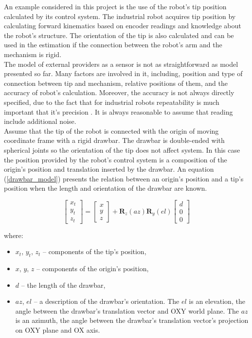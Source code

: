 An example considered in this project is the use of the robot's tip position calculated by its control system. The industrial robot acquires tip position by calculating forward kinematics based on encoder readings and knowledge about the robot's structure. The orientation of the tip is also calculated and can be used in the estimation if the connection between the robot's arm and the mechanism is rigid.\\

The model of external providers as a sensor is not as straightforward as model presented so far. Many factors are involved in it, including, position and type of connection between tip and mechanism, relative positions of them, and the accuracy of robot's calculation. Moreover, the accuracy is not always directly specified, due to the fact that for industrial robots repeatability is much important that it's precision \cite{shiakolas2002accuracy}.
It is always reasonable to assume that reading include additional noise.\\

Assume that the tip of the robot is connected with the origin of moving coordinate frame with a rigid drawbar. The drawbar is double-ended with spherical joints so the orientation of the tip does not affect system. In this case the position provided by the robot's control system is a composition of the origin's position and translation inserted by the drawbar. An equation (\ref{drawbar_model}) presents the relation between an origin's position and a tip's position when the length and orientation of the drawbar are known.

\begin{equation}
	\begin{bmatrix}
		x_t \\ y_t \\ z_t 
	\end{bmatrix}
	=
	\begin{bmatrix}
		x \\ y \\ z 
	\end{bmatrix}
	+
	\bm{R}_z \left( az \right)
	\bm{R}_y \left( el \right)
	\begin{bmatrix}
		d \\ 0 \\ 0 
	\end{bmatrix}
	\label{drawbar_model}
\end{equation}

where:
\begin{itemize}
	\item $x_t$, $y_t$, $z_t$ -- components of the tip's position,
	\item $x$, $y$, $z$ -- components of the origin's position,
	\item $d$ -- the length of the drawbar,
	\item $az$, $el$ -- a description of the drawbar's orientation. The $el$ is an elevation, the angle between the drawbar's translation vector and OXY world plane. The $az$ is an azimuth, the angle between the drawbar's translation vector's projection on OXY plane and OX axis.
\end{itemize}




